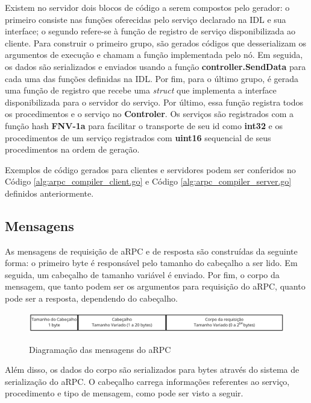 Existem  no servidor dois blocos de código a serem compostos pelo gerador: o primeiro consiste nas funções oferecidas pelo serviço declarado na IDL e sua interface; o segundo refere-se à função de registro de serviço disponibilizada ao cliente. Para construir o primeiro grupo, são gerados códigos que desserializam os argumentos de execução e chamam a função implementada pelo nó. Em seguida, os dados são serializados e enviados usando a função \textbf{controller.SendData} para cada uma das funções definidas na IDL. Por fim, para o último grupo, é gerada uma função de registro que recebe uma \textit{struct} que implementa a interface disponibilizada para o servidor do serviço. Por último, essa função registra todos os procedimentos e o serviço no \textbf{Controler}. Os serviços são registrados com a função hash \textbf{FNV-1a} para facilitar o transporte de seu id como \textbf{int32} e os procedimentos de um serviço registrados com \textbf{uint16} sequencial de seus procedimentos na ordem de geração. 

Exemplos de código gerados para clientes e servidores podem ser conferidos no Código \ref{alg:arpc_compiler_client.go} e Código \ref{alg:arpc_compiler_server.go} definidos anteriormente.

\subsection{Mensagens}

As mensagens de requisição de aRPC e de resposta são construídas da seguinte forma: o primeiro byte é responsável pelo tamanho do cabeçalho a ser lido. Em seguida, um cabeçalho de tamanho variável é enviado. Por fim, o corpo da mensagem, que tanto podem ser os argumentos para requisição do aRPC, quanto pode ser a resposta, dependendo do cabeçalho. 

\begin{figure}[ht]
    \centering
    \caption{Diagramação das mensagens do aRPC}
    \includegraphics[width=\textwidth]{figuras/diagramas/cap3/arpc_message.png} 
    \label{fig:arpc_messages}
\end{figure}

Além disso, os dados do corpo são serializados para bytes através do sistema de serialização do aRPC. O cabeçalho carrega informações referentes ao serviço, procedimento e tipo de mensagem, como pode ser visto a seguir.

